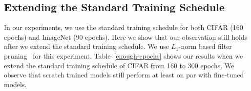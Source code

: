 \subsection{Extending the Standard Training Schedule}
In our experiments, we use the standard training schedule for both CIFAR (160 epochs) and ImageNet (90 epochs). Here we show that our observation still holds after we extend the standard training schedule. We use $L_1$-norm based filter pruning~\cite{li2016pruning} for this experiment. Table~\ref{enough-epochs} shows our results when we extend the standard training schedule of CIFAR from 160 to 300 epochs. We observe that scratch trained models still perform at least on par with fine-tuned models.

\setlength{\tabcolsep}{5pt}
\renewcommand{\arraystretch}{1.2}
\begin{table}[!htbp]
\small
\centering
{}
\caption{Results for $L_1$-norm filter pruning~\cite{li2016pruning} when the training schedule of the large model is extended from 160 to 300 epochs.
}
\label{enough-epochs}
\end{table}


